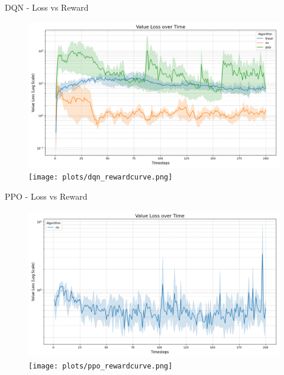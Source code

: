 \documentclass[serif]{beamer}  %
\begin{document}
\begin{frame}{DQN - Loss vs Reward}
    \begin{figure}
        \centering
        \includegraphics[width=\linewidth]{plots/dqn_value_loss_curve.png}
        \texttt{[image: plots/dqn\_rewardcurve.png]}
    \end{figure}
\end{frame}

\begin{frame}{PPO - Loss vs Reward}
    \begin{figure}
        \centering
        \includegraphics[width=\linewidth]{plots/ppo_value_loss_curve.png}
        \texttt{[image: plots/ppo\_rewardcurve.png]}
    \end{figure}
\end{frame}
\end{document}
